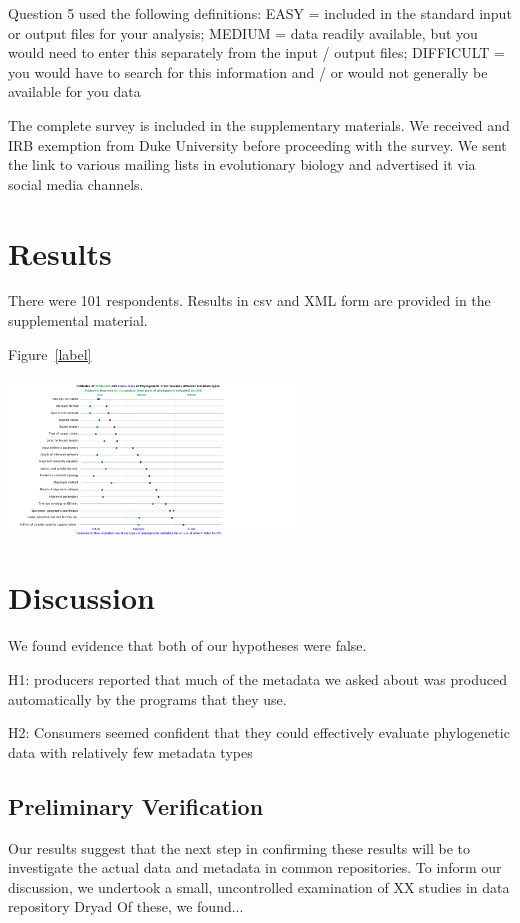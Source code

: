 \documentclass[12pt]{scrartcl}
\newenvironment{Figure}
  {\par\medskip\noindent\minipage{\linewidth}}
  {\endminipage\par\medskip}
\begin{document}
Question 5 used the following definitions: EASY = included in the standard input or output files for your analysis; MEDIUM = data readily available, but you would need to enter this separately from the input / output files; DIFFICULT = you would have to search for this information and / or would not generally be available for you data

The complete survey is included in the supplementary materials. We received and IRB exemption from Duke University before proceeding with the survey. We sent the link to various mailing lists in evolutionary biology and advertised it via social media channels. 

\section{Results}
There were 101 respondents. Results in csv and XML form are provided in the supplemental material. 

Figure~\ref{label}
\begin{Figure}
	\includegraphics[width=3in]{rasters/OTOL graph - wide.png}
	\label{label}
\end{Figure}

\section{Discussion}
We found evidence that both of our hypotheses were false. 

H1: producers reported that much of the metadata we asked about was produced automatically by the programs that they use.

H2: Consumers seemed confident that they could effectively evaluate phylogenetic data with relatively few metadata types

\subsection{Preliminary Verification}
Our results suggest that the next step in confirming these results will be to investigate the actual data and metadata in common repositories.  To inform our discussion, we undertook a small, uncontrolled examination of XX%
studies in data repository Dryad %
Of these, we found... %
\end{document}
